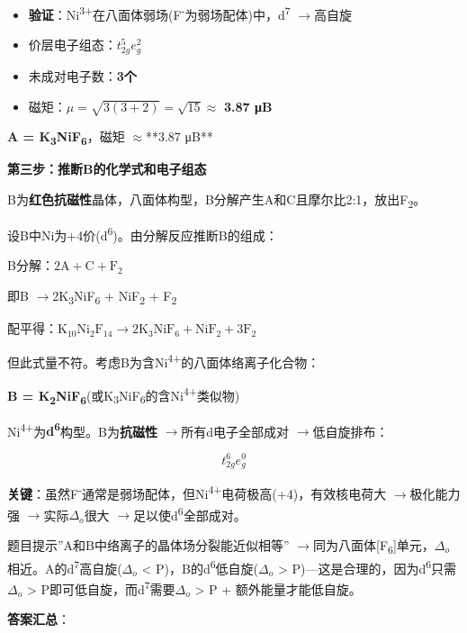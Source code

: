 \documentclass[a4paper,11pt]{ctexart}
\providecommand{\tightlist}{\setlength{\itemsep}{0pt}\setlength{\parskip}{0pt}}
\newcommand{\箭}{\ensuremath{\rightarrow}}
\newcommand{\左箭}{\ensuremath{\leftarrow}}
\newcommand{\上箭}{\ensuremath{\uparrow}}
\newcommand{\下箭}{\ensuremath{\downarrow}}
\newcommand{\衡}{\ensuremath{\rightleftharpoons}}
\newcommand{\双箭}{\ensuremath{\leftrightarrow}}
\newcommand{\约等于}{\ensuremath{\approx}}
\newcommand{\小于等于}{\ensuremath{\leq}}
\newcommand{\大于等于}{\ensuremath{\geq}}
\newcommand{\不等于}{\ensuremath{\neq}}
\newcommand{\西格马}{\ensuremath{\sigma}}
\newcommand{\派}{\ensuremath{\pi}}
\begin{document}
\begin{itemize}
\tightlist
\item
  \textbf{验证}：Ni\textsuperscript{3+}在八面体弱场(F\textsuperscript{-}为弱场配体)中，d\textsuperscript{7} \箭 高自旋
\item
  价层电子组态：\(t_{2g}^{5}e_{g}^{2}\)
\item
  未成对电子数：\textbf{3个}
\item
  磁矩：\(\mu = \sqrt{3(3+2)} = \sqrt{15} \approx\) \textbf{3.87 μB}
\end{itemize}

\textbf{A = K\textsubscript{3}NiF\textsubscript{6}}，磁矩 \约等于 **3.87 μB**

\textbf{第三步：推断B的化学式和电子组态}

B为\textbf{红色抗磁性}晶体，八面体构型，B分解产生A和C且摩尔比2:1，放出F\textsubscript{2}。

设B中Ni为+4价(d\textsuperscript{6})。由分解反应推断B的组成：

B分解：\(2\text{A} + \text{C} + \text{F}_2\)

即B \箭 2K\textsubscript{3}NiF\textsubscript{6} + NiF\textsubscript{2} + F\textsubscript{2}

配平得：\(\text{K}_{10}\text{Ni}_2\text{F}_{14} \rightarrow 2\text{K}_3\text{NiF}_6 + \text{NiF}_2 + 3\text{F}_2\)

但此式量不符。考虑B为含Ni\textsuperscript{4+}的八面体络离子化合物：

\textbf{B = K\textsubscript{2}NiF\textsubscript{6}}(或K\textsubscript{3}NiF\textsubscript{6}的含Ni\textsuperscript{4+}类似物)

Ni\textsuperscript{4+}为\textbf{d\textsuperscript{6}}构型。B为\textbf{抗磁性} \箭 所有d电子全部成对 \箭 低自旋排布：

\[t_{2g}^{6}e_{g}^{0}\]

\textbf{关键}：虽然F\textsuperscript{-}通常是弱场配体，但Ni\textsuperscript{4+}电荷极高(+4)，有效核电荷大 \箭 极化能力强 \箭 实际\(\Delta_o\)很大 \箭 足以使d\textsuperscript{6}全部成对。

题目提示''A和B中络离子的晶体场分裂能近似相等'' \箭 同为八面体{[}F\textsubscript{6}{]}单元，\(\Delta_o\)相近。A的d\textsuperscript{7}高自旋(\(\Delta_o\) \textless{} P)，B的d\textsuperscript{6}低自旋(\(\Delta_o\) \textgreater{} P)---这是合理的，因为d\textsuperscript{6}只需\(\Delta_o\) \textgreater{} P即可低自旋，而d\textsuperscript{7}需要\(\Delta_o\) \textgreater{} P + 额外能量才能低自旋。

\textbf{答案汇总}：
\end{document}
